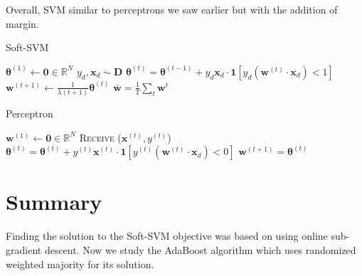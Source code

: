 \documentclass[11pt]{article}
\begin{document}
Overall, SVM similar to perceptrons we saw earlier but with the addition of margin.

\begin{minipage}{0.49\textwidth}
\begin{algorithm}[H]
\caption{Soft-SVM}
\label{algo:soft-svm}
\begin{algorithmic}[1]
\STATE $\boldsymbol{\theta}^{(1)} \leftarrow \mathbf{0} \in \mathbb{R}^N$
\STATE $y_d, \boldsymbol{x}_d \sim \boldsymbol{D}$
\STATE $\boldsymbol{\theta}^{(t)} = \boldsymbol{\theta}^{(t-1)} + y_d \boldsymbol{x}_d \cdot \mathbf{1} [y_d (\boldsymbol{w}^{(t)} \cdot \boldsymbol{x}_d) < 1]$
\STATE $\boldsymbol{w}^{(t+1)} \leftarrow \frac{1}{\lambda(t+1)} \boldsymbol{\theta}^{(t)}$
\ENDFOR
\STATE $\bar{\boldsymbol{w}} = \frac{1}{T} \sum_t \boldsymbol{w}^t$
\end{algorithmic}
\end{algorithm}
\end{minipage}
\hfill
\begin{minipage}{0.49\textwidth}
\begin{algorithm}[H]
\caption{Perceptron}
\label{algo:perceptron}
\begin{algorithmic}[1]
\STATE $\textbf{w}^{(1)} \leftarrow \mathbf{0} \in \mathbb{R}^N$
\STATE \textsc{Receive} ($\boldsymbol{x}^{(t)}, y^{(t)}$)
\STATE $\boldsymbol{\theta}^{(t)} = \boldsymbol{\theta}^{(t)} + y^{(t)} \boldsymbol{x}^{(t)} \cdot \mathbf{1} [y^{(t)} (\boldsymbol{w}^{(t)} \cdot \boldsymbol{x}_d) < 0]$
\STATE $\boldsymbol{w}^{(t+1)} = \boldsymbol{\theta}^{(t)}$
\ENDFOR
\end{algorithmic}
\end{algorithm}
\end{minipage}




\section{Summary}
Finding the solution to the Soft-SVM objective was based on using online sub-gradient descent. Now we study
the AdaBoost algorithm which uses randomized weighted majority for its solution.
\end{document}
